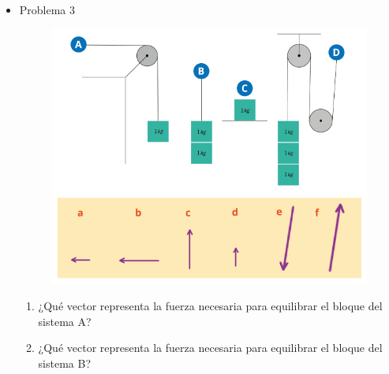 \documentclass[11pt]{book}
\begin{document}
\begin{itemize}
        \newpage
  \item Problema 3
        \begin{boxK}
          \begin{figure}[H]
            \centering
            \includegraphics[width=0.9\linewidth]{poleas02.png}
          \end{figure}
          \begin{enumerate}
            \item ¿Qué vector representa la fuerza necesaria para equilibrar el bloque
                  del sistema A?\\
            \item ¿Qué vector representa la fuerza necesaria para equilibrar el bloque
                  del sistema B?\\
\end{enumerate}
\end{boxK}
\end{itemize}
\end{document}
